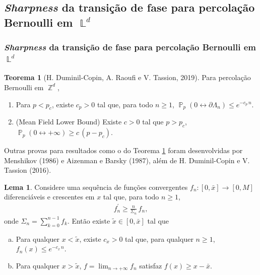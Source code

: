 \documentclass[9pt]{beamer}
\theoremstyle{definition} %
\newtheorem{mythm}{Teorema}
\newtheorem{mylem}{Lema}
\DeclareMathOperator{\PX}{\mathbb{P}} %
\DeclareMathOperator{\ZX}{\mathbb{Z}} %
\DeclareMathOperator{\LX}{\mathbb{L}} %
\begin{document}
	\subsection{\textit{Sharpness} da transição de fase para percolação Bernoulli em $\LX^d$}
	\begin{frame}[t]
		\frametitle{\textit{Sharpness} da transição de fase para percolação Bernoulli em $\LX^d$}
		\begin{mythm}[H. Duminil-Copin, A. Raoufi e V. Tassion, 2019]\label{thm:decai-exp}
			Para percolação Bernoulli em $\ZX^d$,
			\begin{enumerate}
				\item Para $p < p_c$, existe $c_p > 0$ tal que, para todo $n \geq 1$, $\PX_p(0 \leftrightarrow \partial\Lambda_n) \leq e^{-c_p \, n}$.
				\item (Mean Field Lower Bound) Existe $c > 0$ tal que $p > p_c$, $\PX_p(0 \leftrightarrow +\infty) \geq c\,(p - p_c)$.
			\end{enumerate}
		\end{mythm}
		\vspace{-3pt}
		Outras provas para resultados como o do Teorema \ref{thm:decai-exp} foram desenvolvidas por Menshikov (1986) e Aizenman e Barsky (1987), além de H. Duminil-Copin e V. Tassion (2016).\pause
		\begin{mylem}\label{lem:analise}
			Considere uma sequência de funções convergentes $f_n: [0, \bar{x}] \to [0, M]$ diferenciáveis e crescentes em $x$ tal que, para todo $n \geq 1$,
			\vspace{-3pt}
			\begin{align*}
			f_n^{\prime} \geq \frac{n}{\Sigma_n} \, f_n,
			\end{align*}\vspace{-6pt}
			onde $\Sigma_n = \sum_{k = 0}^{n - 1}f_k$. Então existe $\tilde{x} \in [0, \bar{x}]$ tal que
			\begin{enumerate}[a.]
				\item Para qualquer $x < \tilde{x}$, existe $c_x > 0$ tal que, para qualquer $n \geq 1$, $f_n(x) \leq e^{-c_x\,n}$.
				\item Para qualquer $x > \tilde{x}$, $f = \lim_{n \to +\infty} f_n$ satisfaz $f(x) \geq x - \bar{x}$.
			\end{enumerate}
		\end{mylem}
	\end{frame}
\end{document}

